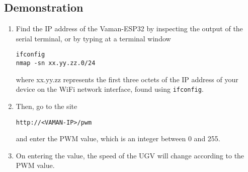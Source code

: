 \subsection{Demonstration}
\begin{enumerate}[resume]
    \item Find the IP address of the Vaman-ESP32 by inspecting the output of the
    serial terminal, or by typing at a terminal window
    \begin{lstlisting}
ifconfig
nmap -sn xx.yy.zz.0/24
    \end{lstlisting}
    where xx.yy.zz represents the first three octets of the IP address of your
    device on the WiFi network interface, found using \texttt{ifconfig}.
    \item Then, go to the site 
    \begin{lstlisting}
http://<VAMAN-IP>/pwm 
    \end{lstlisting}
    and enter the PWM value, which is an integer between 0 and 255.
    \item On entering the value, the speed of the UGV will change according to
    the PWM value.
\end{enumerate}